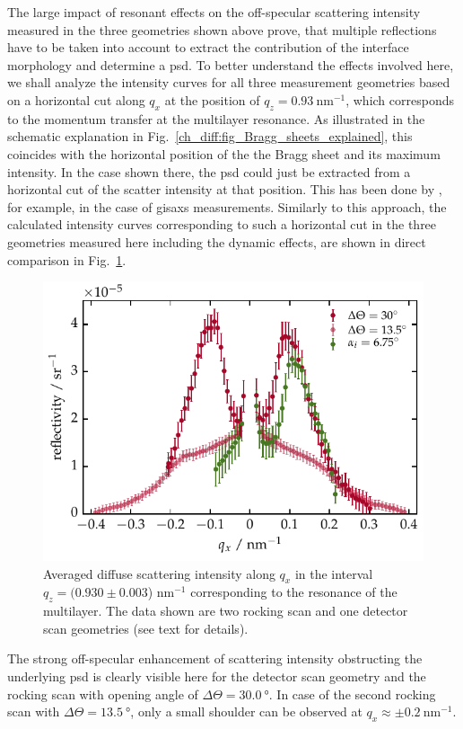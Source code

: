 The large impact of resonant effects on the off-specular scattering intensity measured in the three geometries shown above prove, that multiple reflections have to be taken into account to extract the contribution of the interface morphology and determine a \gls{psd}. To better understand the effects involved here, we shall analyze the intensity curves for all three measurement geometries based on a horizontal cut along $q_x$ at the position of $q_z=\SI{0.93}{\nano\meter^{-1}}$, which corresponds to the momentum transfer at the multilayer resonance. As illustrated in the schematic explanation in Fig.~\ref{ch_diff:fig_Bragg_sheets_explained}, this coincides with the horizontal position of the the Bragg sheet and its maximum intensity. In the case shown there, the \gls{psd} could just be extracted from a horizontal cut of the scatter intensity at that position. This has been done by \textcite{siffalovic_characterization_2009}, for example, in the case of \gls{gisaxs} measurements. Similarly to this approach, the calculated intensity curves corresponding to such a horizontal cut in the three geometries measured here including the dynamic effects, are shown in direct comparison in Fig.~\ref{ch_diff:fig_PTB17_qx_cuts_different_geometries}.
\begin{figure}[htbp]
	\includegraphics{img/PTB17_diffuse_BraggSheet_DetectorAndRocking} \caption{Averaged diffuse scattering intensity along $q_x$ in the interval  $q_z=(0.930 \pm 0.003$) nm$^{-1}$ corresponding to the resonance of the multilayer. The data shown are two rocking scan and one detector scan geometries (see text for details).} \label{ch_diff:fig_PTB17_qx_cuts_different_geometries}
\end{figure}
The strong off-specular enhancement of scattering intensity obstructing the underlying \gls{psd} is clearly visible here for the detector scan geometry and the rocking scan with opening angle of $\Delta\Theta = \SI{30.0}{\degree}$. In case of the second rocking scan with $\Delta\Theta = \SI{13.5}{\degree}$, only a small shoulder can be observed at $q_x \approx \pm \SI{0.2}{\nano\meter^{-1}}$.

